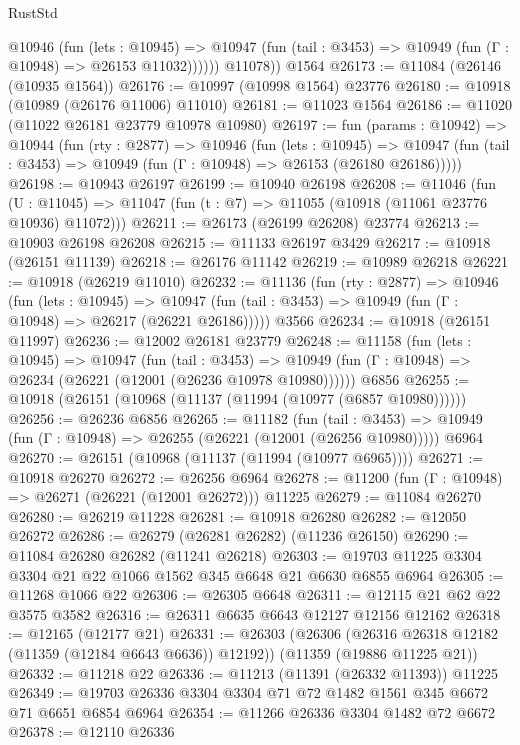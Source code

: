 \begin{lexlean}{RustStd}
\begin{coremodule}
{{{{{{{{{{{{{{{{{{{            @10946
              (fun (lets : @10945) =>
              @10947 (fun (tail : @3453) => @10949 (fun (Γ : @10948) => @26153 @11032))))))
        @11078))
    @1564
@26173 := @11084 (@26146 (@10935 @1564))
@26176 := @10997 (@10998 @1564) @23776
@26180 := @10918 (@10989 (@26176 @11006) @11010)
@26181 := @11023 @1564
@26186 := @11020 (@11022 @26181 @23779 @10978 @10980)
@26197 := fun (params : @10942) =>
  @10944
    (fun (rty : @2877) =>
    @10946
      (fun (lets : @10945) =>
      @10947 (fun (tail : @3453) => @10949 (fun (Γ : @10948) => @26153 (@26180 @26186)))))
@26198 := @10943 @26197
@26199 := @10940 @26198
@26208 := @11046
    (fun (U : @11045) => @11047 (fun (t : @7) => @11055 (@10918 (@11061 @23776 @10936) @11072)))
@26211 := @26173 (@26199 @26208) @23774
@26213 := @10903 @26198 @26208
@26215 := @11133 @26197 @3429
@26217 := @10918 (@26151 @11139)
@26218 := @26176 @11142
@26219 := @10989 @26218
@26221 := @10918 (@26219 @11010)
@26232 := @11136
    (fun (rty : @2877) =>
    @10946
      (fun (lets : @10945) =>
      @10947 (fun (tail : @3453) => @10949 (fun (Γ : @10948) => @26217 (@26221 @26186)))))
    @3566
@26234 := @10918 (@26151 @11997)
@26236 := @12002 @26181 @23779
@26248 := @11158
    (fun (lets : @10945) =>
    @10947
      (fun (tail : @3453) =>
      @10949 (fun (Γ : @10948) => @26234 (@26221 (@12001 (@26236 @10978 @10980))))))
    @6856
@26255 := @10918 (@26151 (@10968 (@11137 (@11994 (@10977 (@6857 @10980))))))
@26256 := @26236 @6856
@26265 := @11182
    (fun (tail : @3453) => @10949 (fun (Γ : @10948) => @26255 (@26221 (@12001 (@26256 @10980)))))
    @6964
@26270 := @26151 (@10968 (@11137 (@11994 (@10977 @6965))))
@26271 := @10918 @26270
@26272 := @26256 @6964
@26278 := @11200 (fun (Γ : @10948) => @26271 (@26221 (@12001 @26272))) @11225
@26279 := @11084 @26270
@26280 := @26219 @11228
@26281 := @10918 @26280
@26282 := @12050 @26272
@26286 := @26279 (@26281 @26282) (@11236 @26150)
@26290 := @11084 @26280 @26282 (@11241 @26218)
@26303 := @19703 @11225 @3304 @3304 @21 @22 @1066 @1562 @345 @6648 @21 @6630 @6855 @6964
@26305 := @11268 @1066 @22
@26306 := @26305 @6648
@26311 := @12115 @21 @62 @22 @3575 @3582
@26316 := @26311 @6635 @6643 @12127 @12156 @12162
@26318 := @12165 (@12177 @21)
@26331 := @26303
    (@26306 (@26316 @26318 @12182 (@11359 (@12184 @6643 @6636)) @12192))
    (@11359 (@19886 @11225 @21))
@26332 := @11218 @22
@26336 := @11213 (@11391 (@26332 @11393)) @11225
@26349 := @19703 @26336 @3304 @3304 @71 @72 @1482 @1561 @345 @6672 @71 @6651 @6854 @6964
@26354 := @11266 @26336 @3304 @1482 @72 @6672
@26378 := @12110
    @26336
}}}}}}}}}}}}}}}}}}}
\end{coremodule}
\end{lexlean}

